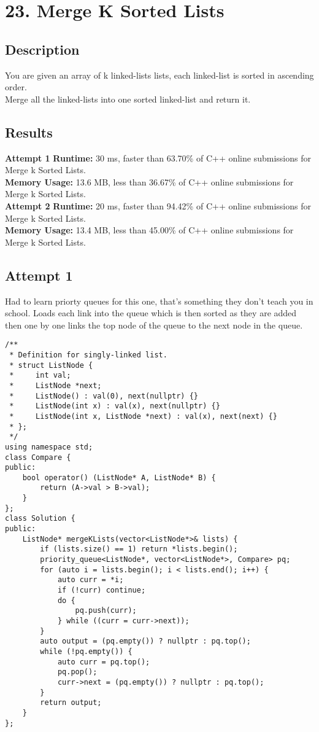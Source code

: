 \chapter{23. Merge K Sorted Lists}
\section{Description}
You are given an array of k linked-lists lists, each linked-list is sorted in ascending order.
\\
Merge all the linked-lists into one sorted linked-list and return it.
\section{Results}
\textbf{Attempt 1}
\textbf{Runtime:}
30 ms, faster than 63.70\% of C++ online submissions for Merge k Sorted Lists.\\
\textbf{Memory Usage:}
13.6 MB, less than 36.67\% of C++ online submissions for Merge k Sorted Lists.\\
\textbf{Attempt 2}
\textbf{Runtime:}
20 ms, faster than 94.42\% of C++ online submissions for Merge k Sorted Lists.\\
\textbf{Memory Usage:}
13.4 MB, less than 45.00\% of C++ online submissions for Merge k Sorted Lists.\\
\newpage
\section{Attempt 1}
Had to learn priorty queues for this one, that's something they don't teach you in school. Loads each link into the queue which is then sorted as they are added then
one by one links the top node of the queue to the next node in the queue.
\begin{lstlisting}
/**
 * Definition for singly-linked list.
 * struct ListNode {
 *     int val;
 *     ListNode *next;
 *     ListNode() : val(0), next(nullptr) {}
 *     ListNode(int x) : val(x), next(nullptr) {}
 *     ListNode(int x, ListNode *next) : val(x), next(next) {}
 * };
 */
using namespace std;
class Compare {
public:
    bool operator() (ListNode* A, ListNode* B) {
        return (A->val > B->val);
    }    
};
class Solution {
public:
    ListNode* mergeKLists(vector<ListNode*>& lists) {
        if (lists.size() == 1) return *lists.begin();
        priority_queue<ListNode*, vector<ListNode*>, Compare> pq;
        for (auto i = lists.begin(); i < lists.end(); i++) {
            auto curr = *i;
            if (!curr) continue;
            do {
                pq.push(curr);
            } while ((curr = curr->next));
        }
        auto output = (pq.empty()) ? nullptr : pq.top();
        while (!pq.empty()) {
            auto curr = pq.top();
            pq.pop();
            curr->next = (pq.empty()) ? nullptr : pq.top();
        }
        return output;
    }
};
\end{lstlisting}
\newpage
